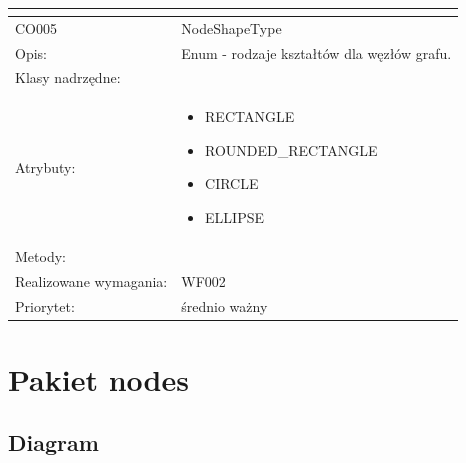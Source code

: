 \documentclass[a4paper,10pt]{article}
\begin{document}
\begin{center}
\begin{longtable}{|m{3cm}|m{9cm}|}
\multicolumn{2}{c}{} \\
 \hline

CO005 & NodeShapeType \\ \hline
Opis: &  Enum - rodzaje kształtów dla węzłów grafu.   \\ \hline
Klasy nadrzędne: &     \\ \hline
Atrybuty: & \begin{itemize}
 \item RECTANGLE
 \item ROUNDED\_RECTANGLE
 \item CIRCLE
 \item ELLIPSE

\end{itemize}
 \\ \hline
Metody: & %
  \\ \hline
Realizowane wymagania: & WF002 \\ \hline
Priorytet: & średnio ważny \\ \hline


\end{longtable}
\end{center}

\section{Pakiet nodes}

\subsection{Diagram}
\end{document}

